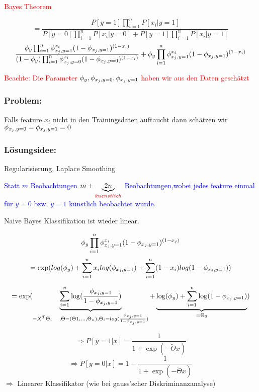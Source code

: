 		\textcolor{red}{Bayes Theorem}
		
		\[ = \frac{P[y = 1] \prod_{i = 1}^{n} P[x_i | y = 1]}{P[y = 0] \prod_{i = 1}^{n} P[x_i | y = 0] + P[y = 1] \prod_{i = 1}^{n} P[x_i | y = 1] }\]
		\[ \frac{\phi_y \prod_{i = 1}^{n} \phi_{x_j, y=1}^{x_i}(1- \phi_{x_j, y=1})^{(1-x_i)}}{(1 - \phi_y) \prod_{i = 1}^{n} \phi_{x_j, y=0}^{x_i}(1- \phi_{x_j, y=0})^{(1-x_i)}} + \phi_y \prod_{i = 1}^{n} \phi_{x_j, y=1}^{x_i}(1- \phi_{x_j, y=1})^{(1-x_i)} \]
		
		\textcolor{red}{Beachte: Die Parameter $ \phi_y, \phi_{x_j, y=0}, \phi_{x_j, y=1} $ haben wir aus den Daten geschätzt}	
	
	\subsubsection*{Problem:}
		
		Falls feature $ x_i $ nicht in den Trainingsdaten auftaucht dann schätzen wir $ \phi_{x_j, y=0} = \phi_{x_j, y=1} = 0  $
	
	\subsubsection*{Lösungsidee:}
		
		Regularisierung, Laplace Smoothing
		
		\textcolor{blue}{Statt $ m $ Beobachtungen $ m + \underbrace{2n}_{\substack{\textcolor{red}{kuenstlich}}} $ Beobachtungen,wobei jedes feature einmal für $ y = 0 $ bzw. $ y = 1 $ künstlich beobachtet wurde.}
		
		
		Naive Bayes Klassifikation ist wieder linear.
		
		\[ \phi_y \prod_{i = 1}^{n} \phi_{x_j, y=1}^{x_i} (1 - \phi_{x_j, y=1})^{(1 - x_j)}\]
		\[ = \exp(log(\phi_y) + \sum_{i = 1}^{n} x_i log(\phi_{x_j, y=1}) + \sum_{i = 1}^{n} (1-x_i) log(1 - \phi_{x_j, y=1})) \]

		\[ = \exp(\underbrace{\sum_{i = 1}^{n} \log(\frac{\phi_{x_j, y=1}}{1- \phi_{x_j, y=1}})}_{\substack{= X^T\Theta_i \quad, \Theta = (\Theta1,\dots,\Theta_n), \Theta_i = log(\frac{\phi_{x_j, y=1}}{1-\phi_{x_j, y=1}})}} + \underbrace{\log(\phi_y) + \sum_{i=1}^{n} \log(1 -\phi_{x_j, y=1})}_{\substack{=\Theta_0}})\]
		
		\[ \Rightarrow P[y = 1| x] = \frac{1}{1 + \exp(- \tilde{\Theta} x)} \]
		\[ \Rightarrow P[y = 0| x] = 1- \frac{1}{1 + \exp(- \tilde{\Theta} x)} \]
		$ \Rightarrow $ Linearer Klassifikator (wie bei gauss'scher Diskriminanzanalyse) 
		
